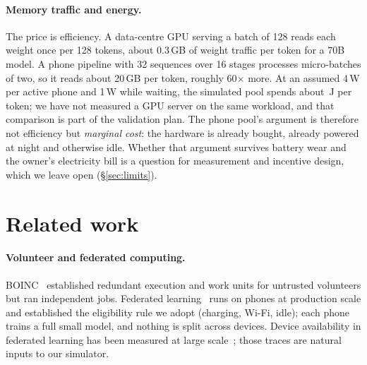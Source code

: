 \documentclass[sigconf,nonacm]{acmart}
\begin{document}
\paragraph{Memory traffic and energy.} The price is efficiency. A data-centre
GPU serving a batch of 128 reads each weight once per 128 tokens, about
0.3\,GB of weight traffic per token for a 70B model. A phone pipeline with 32
sequences over 16 stages processes micro-batches of two, so it reads about
20\,GB per token, roughly 60$\times$ more. At an assumed 4\,W per active phone and
1\,W while waiting, the simulated pool spends about \JNS\,J per token; we have
not measured a GPU server on the same workload, and that comparison is part of
the validation plan. The phone pool's argument is therefore not
efficiency but \emph{marginal cost}: the hardware is already bought, already
powered at night and otherwise idle. Whether that argument survives battery
wear and the owner's electricity bill is a question for measurement and
incentive design, which we leave open (\S\ref{sec:limits}).

\section{Related work}

\paragraph{Volunteer and federated computing.} BOINC~\cite{boinc} established
redundant execution and work units for untrusted volunteers but ran independent
jobs. Federated learning~\cite{fedavg,bonawitz2019} runs on phones at
production scale and established the eligibility rule we adopt (charging,
Wi-Fi, idle); each phone trains a full small model, and nothing is split across
devices. Device availability in federated learning has been measured at large
scale~\cite{yang2021heterogeneity,fedscale}; those traces are natural inputs
to our simulator.
\end{document}
